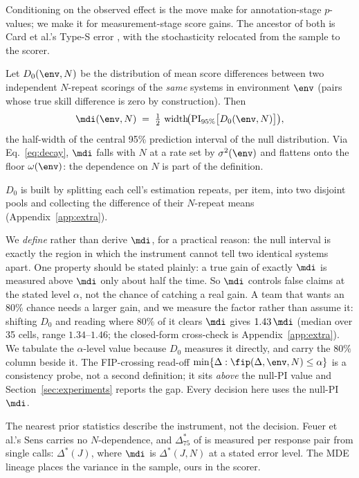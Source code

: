 Conditioning on the observed effect is the move \citet{baumann2025llmhacking}
make for annotation-stage $p$-values; we make it for measurement-stage
score gains. The ancestor of both is Card et al.'s Type-S error
\citep{card2020power}, with the stochasticity relocated from the sample to
the scorer.

\begin{definition}
  \label{def:mdi}
  Let $D_0(\env, N)$ be the distribution of mean score differences between
  two independent $N$-repeat scorings of the \emph{same} systems in
  environment $\env$ (pairs whose true skill difference is zero by
  construction). Then
  \begin{equation*}
    \mdi(\env, N)
      \;=\; \tfrac{1}{2}\,
      \operatorname{width}\!\bigl(\mathrm{PI}_{95\%}\bigl[D_0(\env, N)\bigr]\bigr),
  \end{equation*}
  the half-width of the central 95\% prediction interval of the null
  distribution. Via Eq.~\eqref{eq:decay}, $\mdi$ falls with $N$ at a rate
  set by $\sigma^2(\env)$ and flattens onto the floor $\omega(\env)$: the
  dependence on $N$ is part of the definition.
\end{definition}

$D_0$ is built by splitting each cell's estimation repeats, per item, into two
disjoint pools and collecting the difference of their $N$-repeat means
(Appendix~\ref{app:extra}).

We \emph{define} rather than derive $\mdi$, for a practical reason: the null
interval is exactly the region in which the instrument cannot tell two
identical systems apart. One property should be stated plainly: a true gain
of exactly $\mdi$ is measured above $\mdi$ only about half the time. So $\mdi$
controls false claims at the stated level $\alpha$, not the chance of catching a real gain.
A team that wants an $80\%$ chance needs a larger gain, and we measure the
factor rather than assume it: shifting $D_0$ and reading where $80\%$ of it
clears $\mdi$ gives $1.43\,\mdi$ (median over 35 cells, range
$1.34$--$1.46$; the closed-form cross-check is
Appendix~\ref{app:extra}). We tabulate the $\alpha$-level value
because $D_0$ measures it directly, and carry the $80\%$ column beside it.
The FIP-crossing read-off
$\min\{\Delta : \fip(\Delta, \env, N) \le \alpha\}$ is a consistency probe,
not a second definition; it sits \emph{above} the null-PI value and
Section~\ref{sec:experiments} reports the gap. Every decision here uses the
null-PI $\mdi$.

The nearest prior statistics describe the instrument, not the decision. Feuer
et al.'s $\mathrm{Sens}$ \citep{feuer2025judgmentnoise} carries no
$N$-dependence, and $\Delta^*_{75}$ of \citet{usami2026darkcurrent} is measured
per response pair from single calls: $\Delta^*(J)$, where $\mdi$ is $\Delta^*(J, N)$ at
a stated error level. The MDE lineage \citep{card2020power,
miller2024errorbars, kotawala2026resolution} places the variance in the sample,
ours in the scorer.

